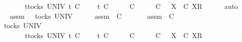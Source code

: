 \ \ \ \ \ \ \ \ \ {\isacharparenleft}{\isasymexists}{\isasymsigma}{\isacharprime}{\isachardot}\ {\isacharparenleft}{\isasymforall}t{\isasymin}tocks\ UNIV{\isachardot}\ t\ {\isasymle}\isactrlsub C\ {\isasymrho}{\isacharprime}\ {\isacharat}\ {\isasymsigma}{\isacharprime}\ {\isasymlongrightarrow}\ t\ {\isasymle}\isactrlsub C\ {\isasymrho}{\isacharprime}{\isacharparenright}\ {\isasymand}\ {\isasymrho}{\isacharprime}\ {\isacharat}\ {\isasymsigma}{\isacharprime}\ {\isasymlesssim}\isactrlsub C\ {\isasymrho}\ {\isacharat}\ {\isasymsigma}\ {\isasymand}\ {\isacharparenleft}{\isasymsigma}{\isacharprime}\ {\isasymlesssim}\isactrlsub C\ {\isasymsigma}\ {\isasymor}\ {\isacharparenleft}{\isasymexists}X{\isachardot}\ {\isasymsigma}{\isacharprime}\ {\isasymlesssim}\isactrlsub C\ {\isacharbrackleft}X{\isacharbrackright}\isactrlsub R\ {\isacharhash}\ {\isasymsigma}{\isacharparenright}{\isacharparenright}{\isacharparenright}{\isachardoublequoteclose}\isanewline
\ \ \isamarkupfalse%
\ {\isacharparenleft}auto{\isacharparenright}\isanewline
\ \ \ \ \isamarkupfalse%
\ assm{}{\isacharcolon}\ {\isachardoublequoteopen}{\isasymrho}{\isacharprime}\ {\isasymin}\ tocks\ UNIV{\isachardoublequoteclose}\isanewline
\ \ \ \ \isamarkupfalse%
\ assm{}{\isacharcolon}\ {\isachardoublequoteopen}{\isasymsigma}{\isacharprime}\ {\isasymlesssim}\isactrlsub C\ {\isasymsigma}{\isachardoublequoteclose}\isanewline
\ \ \ \ \isamarkupfalse%
\ assm{}{\isacharcolon}\ {\isachardoublequoteopen}{\isasymrho}{\isacharprime}\ {\isasymlesssim}\isactrlsub C\ {\isasymrho}{\isachardoublequoteclose}\isanewline
\ \ \ \ \isamarkupfalse%
\ {\isachardoublequoteopen}{\isasymexists}{\isasymrho}{\isacharprime}{\isachardot}\ {\isasymrho}{\isacharprime}\ {\isasymin}\ tocks\ UNIV\ {\isasymand}\isanewline
\ \ \ \ \ \ \ \ \ {\isacharparenleft}{\isasymexists}{\isasymsigma}{\isacharprime}{\isachardot}\ {\isacharparenleft}{\isasymforall}t{\isasymin}tocks\ UNIV{\isachardot}\ t\ {\isasymle}\isactrlsub C\ {\isasymrho}{\isacharprime}\ {\isacharat}\ {\isasymsigma}{\isacharprime}\ {\isasymlongrightarrow}\ t\ {\isasymle}\isactrlsub C\ {\isasymrho}{\isacharprime}{\isacharparenright}\ {\isasymand}\ {\isasymrho}{\isacharprime}\ {\isacharat}\ {\isasymsigma}{\isacharprime}\ {\isasymlesssim}\isactrlsub C\ {\isasymrho}\ {\isacharat}\ {\isasymsigma}\ {\isasymand}\ {\isacharparenleft}{\isasymsigma}{\isacharprime}\ {\isasymlesssim}\isactrlsub C\ {\isasymsigma}\ {\isasymor}\ {\isacharparenleft}{\isasymexists}X{\isachardot}\ {\isasymsigma}{\isacharprime}\ {\isasymlesssim}\isactrlsub C\ {\isacharbrackleft}X{\isacharbrackright}\isactrlsub R\ {\isacharhash}\ {\isasymsigma}{\isacharparenright}{\isacharparenright}{\isacharparenright}{\isachardoublequoteclose}\isanewline
